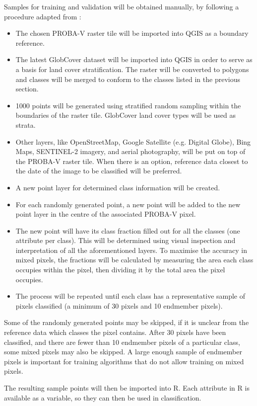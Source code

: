 \documentclass[a4paper,10pt]{article}
\begin{document}
Samples for training and validation will be obtained manually, by following a procedure adapted from \citep{defries1998training}:
\begin{itemize}
 \item The chosen PROBA-V raster tile will be imported into QGIS as a boundary reference.
 \item The latest GlobCover dataset will be imported into QGIS in order to serve as a basis for land cover stratification. The raster will be converted to polygons and classes will be merged to conform to the classes listed in the previous section.
 \item 1000 points will be generated using stratified random sampling within the boundaries of the raster tile. GlobCover land cover types will be used as strata.
 \item Other layers, like OpenStreetMap, Google Satellite (e.g. Digital Globe), Bing Maps, SENTINEL-2 imagery, and aerial photography, will be put on top of the PROBA-V raster tile. When there is an option, reference data closest to the date of the image to be classified will be preferred.
 \item A new point layer for determined class information will be created.
 \item For each randomly generated point, a new point will be added to the new point layer in the centre of the associated PROBA-V pixel.
 \item The new point will have its class fraction filled out for all the classes (one attribute per class). This will be determined using visual inspection and interpretation of all the aforementioned layers. To maximise the accuracy in mixed pixels, the fractions will be calculated by measuring the area each class occupies within the pixel, then dividing it by the total area the pixel occupies.
 \item The process will be repeated until each class has a representative sample of pixels classified (a minimum of 30 pixels and 10 endmember pixels).
\end{itemize}

Some of the randomly generated points may be skipped, if it is unclear from the reference data which classes the pixel contains. After 30 pixels have been classified, and there are fewer than 10 endmember pixels of a particular class, some mixed pixels may also be skipped. A large enough sample of endmember pixels is important for training algorithms that do not allow training on mixed pixels.

The resulting sample points will then be imported into R. Each attribute in R is available as a variable, so they can then be used in classification.
\end{document}
